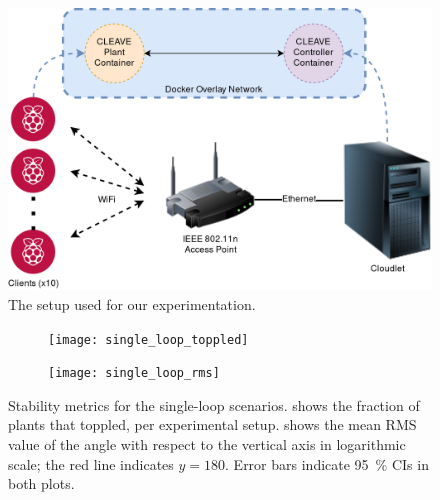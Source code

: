 \begin{figure}
    \centering
    \includegraphics[width=.95\columnwidth]{images/CLEAVE_experiment_setup}
    \caption{
        The setup used for our experimentation. 
    }\label{fig:cleave:expsetup}
\end{figure}

\begin{figure}[h]
    \centering
    \begin{subfigure}[t]{.5\textwidth}
        \centering
        \texttt{[image: single\_loop\_toppled]}
        \caption{}%
        \label{fig:single:topple}
    \end{subfigure}%
    \begin{subfigure}[t]{.5\textwidth}
        \centering
        \texttt{[image: single\_loop\_rms]}
        \caption{}\label{fig:single:rms}
    \end{subfigure}%
    \caption[caption]{
        Stability metrics for the single-loop scenarios.
         shows the fraction of plants that toppled, per experimental setup.
         shows the mean \ac{RMS} value of the angle with respect to the vertical axis in logarithmic scale; the red line indicates \( y = 180 \).
        Error bars indicate \SI{95}{\percent} \acp{CI} in both plots.
        }%
    \label{fig:single:stability}
\end{figure}

